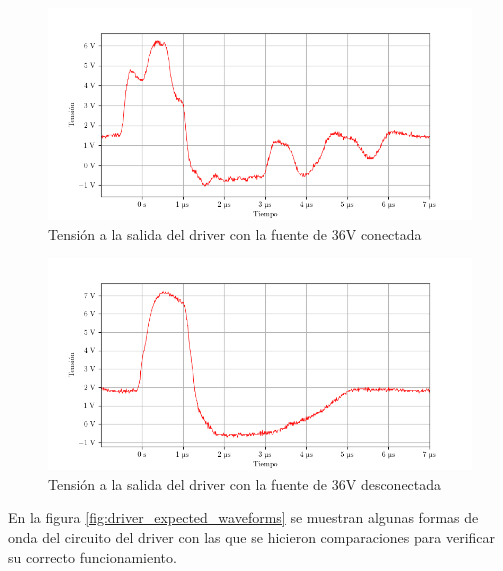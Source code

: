 \begin{figure}[H]
    \centering
    \includegraphics[width=\textwidth]{images/capturas-osciloscopio/DRIVER/driver_vout_connected.png}
    \caption{Tensión a la salida del driver con la fuente de 36V conectada}
    \label{fig:driver_vout_connected}
\end{figure}
\begin{figure}[H]
    \centering
    \includegraphics[width=\textwidth]{images/capturas-osciloscopio/DRIVER/driver_vout_disconnected.png}
    \caption{Tensión a la salida del driver con la fuente de 36V desconectada}
    \label{fig:driver_vout_disconnected}
\end{figure}

En la figura \ref{fig:driver_expected_waveforms} se muestran algunas formas de onda del circuito del driver con las que se hicieron comparaciones para verificar su correcto funcionamiento.

